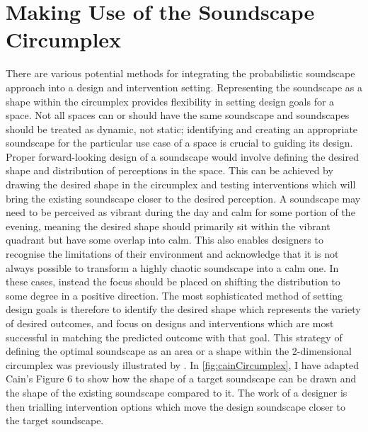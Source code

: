 \section{Making Use of the Soundscape Circumplex}
There are various potential methods for integrating the probabilistic soundscape approach into a design and intervention setting. Representing the soundscape as a shape within the circumplex provides flexibility in setting design goals for a space. Not all spaces can or should have the same soundscape and soundscapes should be treated as dynamic, not static; identifying and creating an appropriate soundscape for the particular use case of a space is crucial to guiding its design. Proper forward-looking design of a soundscape would involve defining the desired shape and distribution of perceptions in the space. This can be achieved by drawing the desired shape in the circumplex and testing interventions which will bring the existing soundscape closer to the desired perception. A soundscape may need to be perceived as vibrant during the day and calm for some portion of the evening, meaning the desired shape should primarily sit within the vibrant quadrant but have some overlap into calm. This also enables designers to recognise the limitations of their environment and acknowledge that it is not always possible to transform a highly chaotic soundscape into a calm one. In these cases, instead the focus should be placed on shifting the distribution to some degree in a positive direction. The most sophisticated method of setting design goals is therefore to identify the desired shape which represents the variety of desired outcomes, and focus on designs and interventions which are most successful in matching the predicted outcome with that goal. This strategy of defining the optimal soundscape as an area or a shape within the 2-dimensional circumplex was previously illustrated by \citet{Cain2013development}. In \cref{fig:cainCircumplex}, I have adapted Cain's Figure 6 to show how the shape of a target soundscape can be drawn and the shape of the existing soundscape compared to it. The work of a designer is then trialling intervention options which move the design soundscape closer to the target soundscape. 

